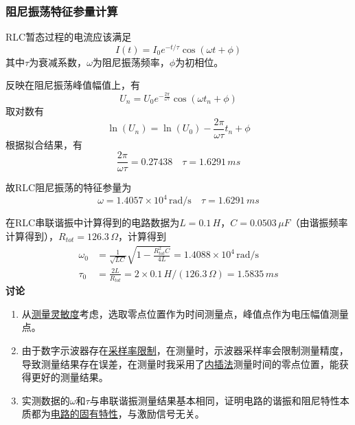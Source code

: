 \documentclass[12pt]{article}
\begin{document}
\subsubsection{阻尼振荡特征参量计算}
\quad RLC暂态过程的电流应该满足
\[
    I(t) = I_0e^{-t/\tau}\cos(\omega t+\phi)
\]
其中$\tau$为衰减系数，$\omega$为阻尼振荡频率，$\phi$为初相位。\\
\par 
反映在阻尼振荡峰值幅值上，有
\[
    U_n = U_0e^{-\frac {2\pi}{\omega\tau}}\cos(\omega t_n+\phi)
\]
\quad 取对数有
\[
    \ln(U_n) = \ln(U_0)-\frac {2\pi}{\omega\tau}t_n+\phi
\]
\quad 根据拟合结果，有
\[
    \frac {2\pi}{\omega\tau}=0.27438\quad \tau=1.6291\,ms
\]
\par 
故RLC阻尼振荡的特征参量为
\begin{equation}
    \omega = 1.4057\times 10^4\,\text{rad/s}\quad \tau=1.6291\,ms
\end{equation}
\par
在RLC串联谐振中计算得到的电路数据为$L=0.1\,H$，$C=0.0503\,\mu F$（由谐振频率计算得到），$R_{tot}=126.3\,\Omega$，计算得到
\begin{equation*}
\begin{aligned}
    \omega_0 &= \frac {1}{\sqrt{LC}}\sqrt{1-\frac{R_{tot}^2C}{4L}}=1.4088\times 10^4\,\text{rad/s}\\
    \tau_0 &= \frac {2L}{R_{tot}}=2\times 0.1\,H/(126.3\,\Omega)=1.5835\,ms
\end{aligned}
\end{equation*}
\textbf{讨论}
\begin{enumerate}
    \item 从\underline{测量灵敏度}考虑，选取零点位置作为时间测量点，峰值点作为电压幅值测量点。
    \item 由于数字示波器存在\underline{采样率限制}，在测量时，示波器采样率会限制测量精度，导致测量结果存在误差，在测量时我采用了\underline{内插法}测量时间的零点位置，能获得更好的测量结果。
    \item 实测数据的$\omega$和$\tau$与串联谐振测量结果基本相同，证明电路的谐振和阻尼特性本质都为\underline{电路的固有特性}，与激励信号无关。
\end{enumerate}
\end{document}

